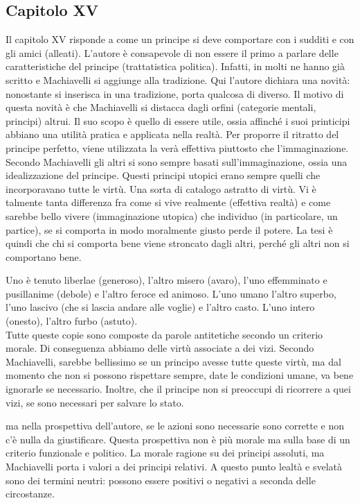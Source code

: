 \documentclass[a4paper]{article}
\begin{document}
\pagebreak

\subsection{Capitolo XV}

Il capitolo XV risponde a come un principe si deve comportare
con i sudditi e con gli amici (alleati).
L'autore è consapevole di non essere il primo a parlare
delle caratteristiche del principe (trattatistica politica).
Infatti, in molti ne hanno già scritto e Machiavelli si
aggiunge alla tradizione.
Qui l'autore dichiara una novità: nonostante si inserisca in una tradizione,
porta qualcosa di diverso.
Il motivo di questa novità è che Machiavelli si distacca
dagli orfini (categorie mentali, principi) altrui.
Il suo scopo è quello di essere utile, ossia
affinché i suoi printicipi abbiano una utilità pratica e applicata
nella realtà.
Per proporre il ritratto del principe perfetto, viene utilizzata
la verà effettiva piuttosto che l'immaginazione.
Secondo Machiavelli gli altri si sono sempre basati sull'immaginazione,
ossia una idealizzazione del principe.
Questi principi utopici erano sempre quelli che incorporavano tutte le virtù.
Una sorta di catalogo astratto di virtù.
Vi è talmente tanta differenza fra come si vive realmente (effettiva realtà)
e come sarebbe bello vivere (immaginazione utopica) che
individuo (in particolare, un partice), se si comporta in modo moralmente giusto
perde il potere. La tesi è quindi che chi si comporta bene
viene stroncato dagli altri, perché gli altri non si comportano bene.

Uno è tenuto liberlae (generoso), l'altro misero (avaro),
l'uno effemminato e pusillanime (debole) e l'altro
feroce ed animoso. L'uno umano l'altro superbo, l'uno lascivo (che si lascia andare alle voglie) e l'altro casto.
L'uno intero (onesto), l'altro furbo (astuto).
\\
Tutte queste copie sono composte da parole antitetiche
secondo un criterio morale. Di conseguenza abbiamo delle virtù associate a dei vizi.
Secondo Machiavelli, sarebbe bellissimo se un principo avesse tutte queste virtù,
ma dal momento che non si possono rispettare sempre, date le condizioni umane,
va bene ignorarle se necessario.
Inoltre, che il principe non si preoccupi di ricorrere a quei vizi,
se sono necessari per salvare lo stato.

ma nella prospettiva dell'autore, se le azioni sono necessarie
sono corrette e non c'è nulla da giustificare.
Questa prospettiva non è più morale ma sulla base di un criterio funzionale
e politico.
La morale ragione su dei principi assoluti, ma Machiavelli porta i valori a
dei principi relativi.
A questo punto lealtà e svelatà sono dei termini neutri:
possono essere positivi o negativi a seconda delle circostanze.
\end{document}
